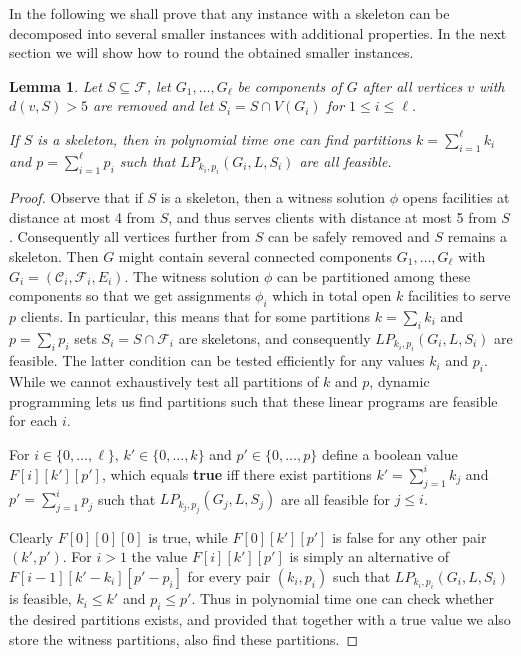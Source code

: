 \documentclass{article}
\newcommand{\F}{\mathcal{F}}
\newcommand{\C}{\mathcal{C}}
\newcommand{\sub}{\subseteq}
\theoremstyle{plain}
\newtheorem{lemma}[theorem]{Lemma}
\theoremstyle{definition}
\begin{document}
In the following we shall prove that any instance 
with a skeleton can be decomposed into several smaller instances
with additional properties. In the next section we will show how
to round the obtained smaller instances.

\begin{lemma}\label{lem:dp}
Let $S\sub \F$, let $G_1,\ldots,G_\ell$ be components
of $G$ after all vertices $v$ with $d(v,S)>5$ are removed
and let $S_i=S\cap V(G_i)$ for $1 \le i \le \ell$.

If $S$ is a skeleton, then in polynomial time one can find partitions $k=\sum_{i=1}^\ell k_i$
and $p=\sum_{i=1}^\ell p_i$ such that $LP_{k_i,p_i}(G_i,L,S_i)$ are all feasible.
\end{lemma}

\begin{proof}
Observe that if $S$ is a skeleton, then a witness solution $\phi$
opens facilities at distance at most 4 from $S$, and thus serves clients
with distance at most 5 from $S$. Consequently all vertices further from $S$ can
be safely removed and $S$ remains a skeleton.
Then $G$ might contain several connected components $G_1,\ldots,G_\ell$
with $G_i=(\C_i,\F_i,E_i)$.  The witness solution
$\phi$ can be partitioned among these components so that we get assignments
$\phi_i$ which in total open $k$ facilities to serve $p$ clients. In particular,
this means that for some partitions $k = \sum_{i} k_i$ and $p = \sum_{i} p_i$
sets $S_i=S\cap \F_i$ are skeletons, and consequently
$LP_{k_i,p_i}(G_i,L,S_i)$ are feasible. The latter condition can be
tested efficiently for any values $k_i$ and $p_i$.
While we cannot exhaustively test all partitions of $k$ and $p$, dynamic
programming lets us find partitions such that these linear programs are
feasible for each $i$.

For $i\in \{0,\ldots,\ell\}$, $k'\in\{0,\ldots,k\}$ and  $p'\in\{0,\ldots,p\}$
define a boolean value $F[i][k'][p']$, which equals {\bf true} iff there exist partitions
$k'=\sum_{j=1}^i k_j$ and $p' = \sum_{j=1}^i p_j$ such that
$LP_{k_j,p_j}(G_j,L,S_j)$ are all feasible for $j\le i$.

Clearly $F[0][0][0]$ is true, while
$F[0][k'][p']$ is false for any other pair $(k',p')$.
For $i > 1$ the value $F[i][k'][p']$ is simply an alternative of
$F[i-1][k'-k_i][p'-p_i]$ for every pair $(k_i,p_i)$ such that
$LP_{k_i,p_i}(G_i,L,S_i)$ is feasible, $k_i\le k'$ and $p_i\le p'$.
Thus in polynomial time one can check whether the desired partitions exists, 
and provided that together with a true value we also store the witness
partitions, also find these partitions.
\end{proof}
\end{document}
